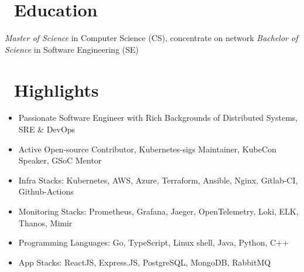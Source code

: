 \documentclass{resume}
\begin{document}



\section{\faGraduationCap\ Education}
\textit{Master of Science} in Computer Science (CS), concentrate on network
\textit{Bachelor of Science} in Software Engineering (SE)

\section{\faCogs\ Highlights}
\begin{itemize}[parsep=0.5ex]
  \item Passionate Software Engineer with Rich Backgrounds of Distributed Systems, SRE \& DevOps
  \item Active Open-source Contributor, Kubernetes-sigs Maintainer, KubeCon Speaker, GSoC Mentor
  \item Infra Stacks: Kubernetes, AWS, Azure, Terraform, Ansible, Nginx, Gitlab-CI, Github-Actions
  \item Monitoring Stacks: Prometheus, Grafana, Jaeger, OpenTelemetry, Loki, ELK, Thanos, Mimir
  \item Programming Languages: Go, TypeScript, Linux shell, Java, Python, C++
  \item App Stacks: ReactJS, Express.JS, PostgreSQL, MongoDB, RabbitMQ
\end{itemize}
\end{document}
